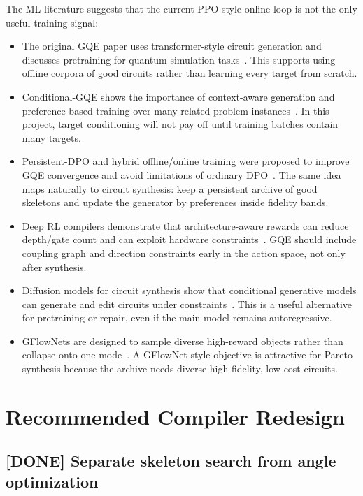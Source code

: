 \documentclass[11pt]{article}
\begin{document}
The ML literature suggests that the current PPO-style online loop is not the
only useful training signal:
\begin{itemize}
  \item The original GQE paper uses transformer-style circuit generation and
  discusses pretraining for quantum simulation tasks~\cite{nakaji2024gqe}.
  This supports using offline corpora of good circuits rather than learning
  every target from scratch.
  \item Conditional-GQE shows the importance of context-aware generation and
  preference-based training over many related problem instances~\cite{minami2025conditional}.
  In this project, target conditioning will not pay off until training batches
  contain many targets.
  \item Persistent-DPO and hybrid offline/online training were proposed to
  improve GQE convergence and avoid limitations of ordinary DPO~\cite{nakamura2025pdpo}.
  The same idea maps naturally to circuit synthesis: keep a persistent archive
  of good skeletons and update the generator by preferences inside fidelity
  bands.
  \item Deep RL compilers demonstrate that architecture-aware rewards can reduce
  depth/gate count and can exploit hardware constraints~\cite{moro2021rl,foesel2021rl,wang2024rl}.
  GQE should include coupling graph and direction constraints early in the
  action space, not only after synthesis.
  \item Diffusion models for circuit synthesis show that conditional generative
  models can generate and edit circuits under constraints~\cite{furrutter2024diffusion}.
  This is a useful alternative for pretraining or repair, even if the main model
  remains autoregressive.
  \item GFlowNets are designed to sample diverse high-reward objects rather than
  collapse onto one mode~\cite{jain2022gflownet}.  A GFlowNet-style objective is
  attractive for Pareto synthesis because the archive needs diverse
  high-fidelity, low-cost circuits.
\end{itemize}

\section{Recommended Compiler Redesign}

\subsection{[DONE] Separate skeleton search from angle optimization}
\end{document}
